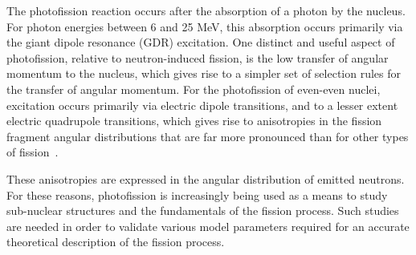 \label{sec:level1}
The photofission reaction occurs after the absorption of a photon by the nucleus. 
For photon energies between 6 and 25 MeV, this absorption occurs primarily via the giant dipole resonance (GDR) excitation.
One distinct and useful aspect of photofission, relative to neutron-induced fission, is the low transfer of angular momentum to the nucleus, which gives rise to a simpler set of selection rules for the transfer of angular momentum.
For the photofission of even-even nuclei, excitation occurs primarily via electric dipole transitions, and to a lesser extent electric quadrupole transitions, which gives rise to anisotropies in the fission fragment angular distributions that are far more pronounced than for other types of fission~\cite{1977FragAss,Mueller2014}.

These anisotropies are expressed in the angular distribution of emitted neutrons.
For these reasons, photofission is increasingly being used as a means to study sub-nuclear structures and the fundamentals of the fission process.
Such studies are needed in order to validate various model parameters required for an accurate theoretical description of the fission process.